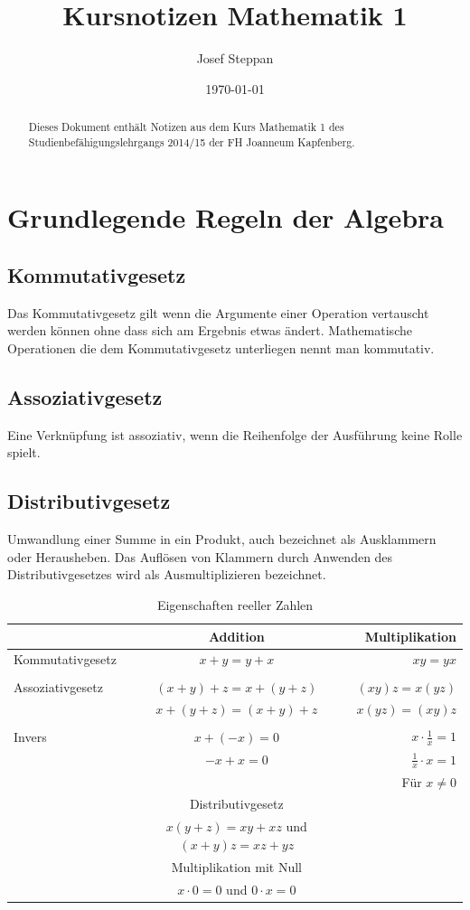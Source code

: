 \documentclass[a4paper]{article}
\title{Kursnotizen Mathematik 1}
\author{Josef Steppan}
\date{\today}
\begin{document}
\maketitle

\begin{abstract}
Dieses Dokument enthält Notizen aus dem Kurs Mathematik 1 des Studienbefähigungslehrgangs 2014/15 der FH Joanneum Kapfenberg.
\end{abstract}


\section{Grundlegende Regeln der Algebra}
\subsection{Kommutativgesetz}
Das Kommutativgesetz gilt wenn die Argumente einer Operation vertauscht werden können ohne dass sich am Ergebnis etwas ändert. Mathematische Operationen die dem Kommutativgesetz unterliegen nennt man kommutativ.
\subsection{Assoziativgesetz}
Eine Verknüpfung ist assoziativ, wenn die Reihenfolge der Ausführung keine Rolle spielt.
\subsection{Distributivgesetz}
Umwandlung einer Summe in ein Produkt, auch bezeichnet als Ausklammern oder Herausheben. Das Auflösen von Klammern durch Anwenden des Distributivgesetzes wird als Ausmultiplizieren bezeichnet.
\begin{table}[b]
\centering
\begin{tabular}{l c r}
& Addition & Multiplikation \\ \hline
Kommutativgesetz & $x+y = y+x$ & $xy = yx$ \\\\
Assoziativgesetz & $(x+y)+z = x+(y+z)$ & $(xy)z = x(yz)$ \\
& $x+(y+z) = (x+y)+z$ & $x(yz) = (xy)z$ \\\\
Invers & $x+(-x) = 0$ & $x \cdot \frac{1}{x} = 1$ \\
& $-x+x = 0$ & $\frac{1}{x} \cdot x = 1$ \\
& & {\small Für $x \neq 0$} \\
\hline
& Distributivgesetz \\
& $x(y+z) = xy + xz$ und $(x+y)z = xz + yz$ \\
& Multiplikation mit Null \\
& $x \cdot 0 = 0$ und $0 \cdot x = 0$ \\
\hline
\end{tabular}
\caption{\label{tab:Algebra}Eigenschaften reeller Zahlen}
\end{table}
\end{document}
